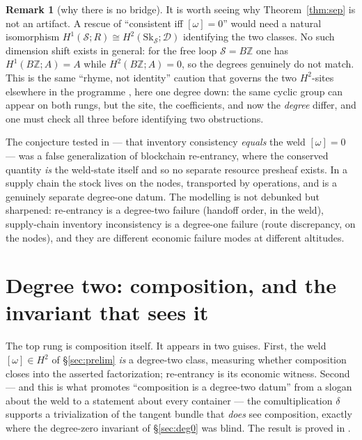 \documentclass[11pt]{article}
\theoremstyle{definition}
\newtheorem{remark}[theorem]{Remark}
\newcommand{\Sk}{\mathrm{Sk}}
\newcommand{\Z}{\mathbb{Z}}
\newcommand{\sS}{\mathcal{S}}
\newcommand{\cD}{\mathcal{D}}
\begin{document}
\begin{remark}[why there is no bridge]\label{rem:nocollapse}
It is worth seeing why Theorem~\ref{thm:sep} is not an artifact. A rescue of ``consistent iff
$[\omega]=0$'' would need a natural isomorphism $H^1(\sS;R)\cong H^2(\Sk_\sS;\cD)$ identifying the
two classes. No such dimension shift exists in general: for the free loop $\sS=B\Z$ one has
$H^1(B\Z;A)=A$ while $H^2(B\Z;A)=0$, so the degrees genuinely do not match. This is the same
``rhyme, not identity'' caution that governs the two $H^2$-sites elsewhere in the programme
\cite{MacBethZS}, here one degree down: the same cyclic group can appear on both rungs, but the
site, the coefficients, and now the \emph{degree} differ, and one must check all three before
identifying two obstructions.
\end{remark}

The conjecture tested in \cite{MacBethSupplyChain} --- that inventory consistency \emph{equals} the
weld $[\omega]=0$ --- was a false generalization of blockchain re-entrancy, where the conserved
quantity \emph{is} the weld-state itself and so no separate resource presheaf exists. In a supply
chain the stock lives on the nodes, transported by operations, and is a genuinely separate
degree-one datum. The modelling is not debunked but sharpened: re-entrancy is a degree-two failure
(handoff order, in the weld), supply-chain inventory inconsistency is a degree-one failure (route
discrepancy, on the nodes), and they are different economic failure modes at different altitudes.

\section{Degree two: composition, and the invariant that sees it}\label{sec:deg2}

The top rung is composition itself. It appears in two guises. First, the weld $[\omega]\in H^2$ of
\S\ref{sec:prelim} \emph{is} a degree-two class, measuring whether composition closes into the
asserted factorization; re-entrancy \cite{MacBethReentrancy} is its economic witness. Second --- and
this is what promotes ``composition is a degree-two datum'' from a slogan about the weld to a
statement about every container --- the comultiplication $\delta$ supports a trivialization of the
tangent bundle that \emph{does} see composition, exactly where the degree-zero invariant of
\S\ref{sec:deg0} was blind. The result is proved in \cite{MacBethDelta}.
\end{document}
